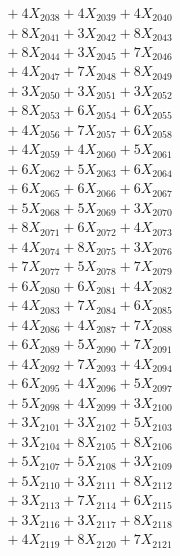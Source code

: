 \documentclass[a4paper,10pt]{article}
\begin{document}
{\begin{align}
&\;  + 4 X_{2038} + 4 X_{2039} + 4 X_{2040} \\[0.3ex]
&\;  + 8 X_{2041} + 3 X_{2042} + 8 X_{2043} \\[0.3ex]
&\;  + 8 X_{2044} + 3 X_{2045} + 7 X_{2046} \\[0.3ex]
&\;  + 4 X_{2047} + 7 X_{2048} + 8 X_{2049} \\[0.5ex]\allowbreak
&\;  + 3 X_{2050} + 3 X_{2051} + 3 X_{2052} \\[0.3ex]
&\;  + 8 X_{2053} + 6 X_{2054} + 6 X_{2055} \\[0.3ex]
&\;  + 4 X_{2056} + 7 X_{2057} + 6 X_{2058} \\[0.3ex]
&\;  + 4 X_{2059} + 4 X_{2060} + 5 X_{2061} \\[0.3ex]
&\;  + 6 X_{2062} + 5 X_{2063} + 6 X_{2064} \\[0.3ex]
&\;  + 6 X_{2065} + 6 X_{2066} + 6 X_{2067} \\[0.3ex]
&\;  + 5 X_{2068} + 5 X_{2069} + 3 X_{2070} \\[0.3ex]
&\;  + 8 X_{2071} + 6 X_{2072} + 4 X_{2073} \\[0.3ex]
&\;  + 4 X_{2074} + 8 X_{2075} + 3 X_{2076} \\[0.3ex]
&\;  + 7 X_{2077} + 5 X_{2078} + 7 X_{2079} \\[0.5ex]\allowbreak
&\;  + 6 X_{2080} + 6 X_{2081} + 4 X_{2082} \\[0.3ex]
&\;  + 4 X_{2083} + 7 X_{2084} + 6 X_{2085} \\[0.3ex]
&\;  + 4 X_{2086} + 4 X_{2087} + 7 X_{2088} \\[0.3ex]
&\;  + 6 X_{2089} + 5 X_{2090} + 7 X_{2091} \\[0.3ex]
&\;  + 4 X_{2092} + 7 X_{2093} + 4 X_{2094} \\[0.3ex]
&\;  + 6 X_{2095} + 4 X_{2096} + 5 X_{2097} \\[0.3ex]
&\;  + 5 X_{2098} + 4 X_{2099} + 3 X_{2100} \\[0.3ex]
&\;  + 3 X_{2101} + 3 X_{2102} + 5 X_{2103} \\[0.3ex]
&\;  + 3 X_{2104} + 8 X_{2105} + 8 X_{2106} \\[0.3ex]
&\;  + 5 X_{2107} + 5 X_{2108} + 3 X_{2109} \\[0.5ex]\allowbreak
&\;  + 5 X_{2110} + 3 X_{2111} + 8 X_{2112} \\[0.3ex]
&\;  + 3 X_{2113} + 7 X_{2114} + 6 X_{2115} \\[0.3ex]
&\;  + 3 X_{2116} + 3 X_{2117} + 8 X_{2118} \\[0.3ex]
&\;  + 4 X_{2119} + 8 X_{2120} + 7 X_{2121} \\[0.3ex]

\end{align}}
\end{document}
